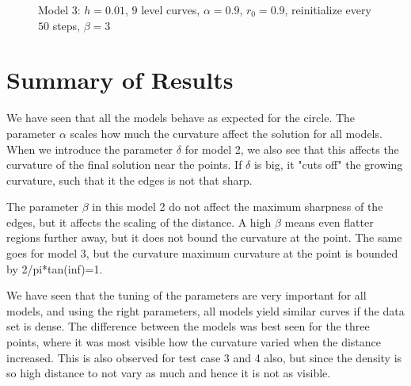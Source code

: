 \begin{figure}
\begin{center}
\end{center}
\vspace{-2.5em}
\caption[Model 3 - Noisy point set, $\alpha=0.8$]{Model 3: $h=0.01$, $9$ level curves, $\alpha=0.9$, $r_0=0.9$, reinitialize every $50$ steps, $\beta=3$}
\label{fig:m3-noisypoints-a08}
\end{figure}

\section{Summary of Results}
We have seen that all the models behave as expected for the circle. The parameter $\alpha$ scales how much the curvature affect the solution for all models. When we introduce the parameter $\delta$ for model 2, we also see that this affects the curvature of the final solution near the points. If $\delta$ is big, it "cuts off" the growing curvature, such that it the edges is not that sharp.

The parameter $\beta$ in this model 2 do not affect the maximum sharpness of the edges, but it affects the scaling of the distance. A high $\beta$ means even flatter regions further away, but it does not bound the curvature at the point. The same goes for model 3, but the curvature maximum curvature at the point is bounded by 2/pi*tan(inf)=1. 

We have seen that the tuning of the parameters are very important for all models, and using the right parameters, all models yield similar curves if the data set is dense. The difference between the models was best seen for the three points, where it was most visible how the curvature varied when the distance increased. This is also observed for test case 3 and 4 also, but since the density is so high distance to not vary as much and hence it is not as visible. 

